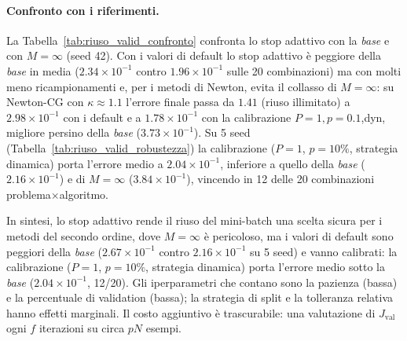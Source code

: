 \documentclass[a4paper,12pt]{article}
\numberwithin{equation}{section}
\numberwithin{figure}{section}
\numberwithin{table}{section}
\begin{document}
\paragraph{Confronto con i riferimenti.}
La Tabella~\ref{tab:riuso_valid_confronto} confronta lo stop adattivo con la
\emph{base} e con $M=\infty$ (seed 42). Con i valori di default lo stop
adattivo è peggiore della \emph{base} in media ($2.34\times10^{-1}$ contro
$1.96\times10^{-1}$ sulle 20 combinazioni) ma con molti meno ricampionamenti
e, per i metodi di Newton, evita il collasso di $M=\infty$: su Newton-CG con
$\kappa\approx1.1$ l'errore finale passa da $1.41$ (riuso illimitato) a
$2.98\times10^{-1}$ con i default e a $1.78\times10^{-1}$ con la calibrazione
$P{=}1,p{=}0.1$,dyn, migliore persino della \emph{base}
($3.73\times10^{-1}$). Su 5 seed (Tabella~\ref{tab:riuso_valid_robustezza}) la
calibrazione ($P=1$, $p=10\%$, strategia dinamica) porta l'errore medio a
$2.04\times10^{-1}$, inferiore a quello della \emph{base}
($2.16\times10^{-1}$) e di $M=\infty$ ($3.84\times10^{-1}$), vincendo in 12
delle 20 combinazioni problema$\times$algoritmo.

In sintesi, lo stop adattivo rende il riuso del mini-batch una scelta sicura
per i metodi del secondo ordine, dove $M=\infty$ è pericoloso, ma i valori di
default sono peggiori della \emph{base} ($2.67\times10^{-1}$ contro
$2.16\times10^{-1}$ su 5 seed) e vanno calibrati: la calibrazione ($P=1$,
$p=10\%$, strategia dinamica) porta l'errore medio sotto la \emph{base}
($2.04\times10^{-1}$, 12/20). Gli iperparametri che contano sono la pazienza
(bassa) e la percentuale di validation (bassa); la strategia di split e la
tolleranza relativa hanno effetti marginali. Il costo aggiuntivo è trascurabile:
una valutazione di $J_{\mathrm{val}}$ ogni $f$ iterazioni su circa $pN$ esempi.


\end{document}
